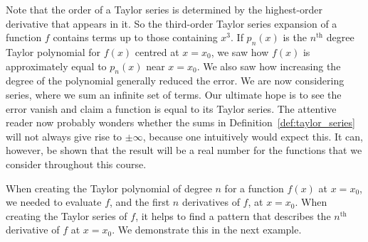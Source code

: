 Note that the order of a Taylor series is determined by the highest-order derivative that appears in it. So the third-order Taylor series expansion of a function $f$ contains terms up to those containing $x^3$.  If $p_n(x)$ is the $n^\text{th}$ degree Taylor polynomial for $f(x)$ centred at $x=x_0$, we saw how $f(x)$ is approximately equal to $p_n(x)$ near $x=x_0$. We also saw how increasing the degree of the polynomial generally reduced the error. We are now considering series, where we sum an infinite set of terms. Our ultimate hope is to see the error vanish and claim a function is equal to its Taylor series. The attentive reader now probably wonders whether the sums in Definition~\ref{def:taylor_series} will not always give rise to  $\pm\infty$, because one intuitively would expect this. It can, however, be shown that the result will be a real number for the functions that we consider throughout this course.   

When creating the Taylor polynomial of degree $n$ for a function $f(x)$ at $x=x_0$, we needed to evaluate $f$, and the first $n$ derivatives of $f$, at $x=x_0$. When creating the Taylor series of $f$, it helps to find a pattern that describes the $n^\text{th}$ derivative of $f$ at $x=x_0$. We demonstrate this in the next example.

